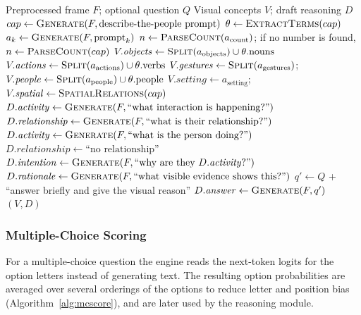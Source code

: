 \begin{algorithm}[H]
\caption{Scene Description and Draft Reasoning with SmolVLM}
\label{alg:vlm}
\begin{algorithmic}[1]
\Require Preprocessed frame $F$; optional question $Q$
\Ensure Visual concepts $V$; draft reasoning $D$
\State $cap \gets \textsc{Generate}(F, \text{describe-the-people prompt})$
\State $\theta \gets \textsc{ExtractTerms}(cap)$ 
  \State $a_k \gets \textsc{Generate}(F, \text{prompt}_k)$
\EndFor
\State $n \gets \textsc{ParseCount}(a_{\text{count}})$; if no number is found, $n \gets \textsc{ParseCount}(cap)$
\State $V.\mathit{objects} \gets \textsc{Split}(a_{\text{objects}}) \cup \theta.\text{nouns}$
\State $V.\mathit{actions} \gets \textsc{Split}(a_{\text{actions}}) \cup \theta.\text{verbs}$
\State $V.\mathit{gestures} \gets \textsc{Split}(a_{\text{gestures}})$;\; $V.\mathit{people} \gets \textsc{Split}(a_{\text{people}}) \cup \theta.\text{people}$
\State $V.\mathit{setting} \gets a_{\text{setting}}$;\; $V.\mathit{spatial} \gets \textsc{SpatialRelations}(cap)$
  \State $D.\mathit{activity} \gets \textsc{Generate}(F, \text{``what interaction is happening?''})$
  \State $D.\mathit{relationship} \gets \textsc{Generate}(F, \text{``what is their relationship?''})$
\Else
  \State $D.\mathit{activity} \gets \textsc{Generate}(F, \text{``what is the person doing?''})$
  \State $D.\mathit{relationship} \gets \text{``no relationship''}$
\EndIf
\State $D.\mathit{intention} \gets \textsc{Generate}(F, \text{``why are they } D.\mathit{activity}\text{?''})$
\State $D.\mathit{rationale} \gets \textsc{Generate}(F, \text{``what visible evidence shows this?''})$
  \State $q' \gets Q$ + ``answer briefly and give the visual reason''
  \State $D.\mathit{answer} \gets \textsc{Generate}(F, q')$
\EndIf
\State \Return $(V, D)$
\end{algorithmic}
\end{algorithm}

\subsubsection{Multiple-Choice Scoring}
For a multiple-choice question the engine reads the next-token logits for the option letters instead of generating text. The resulting option probabilities are averaged over several orderings of the options to reduce letter and position bias (Algorithm~\ref{alg:mcscore}), and are later used by the reasoning module.

